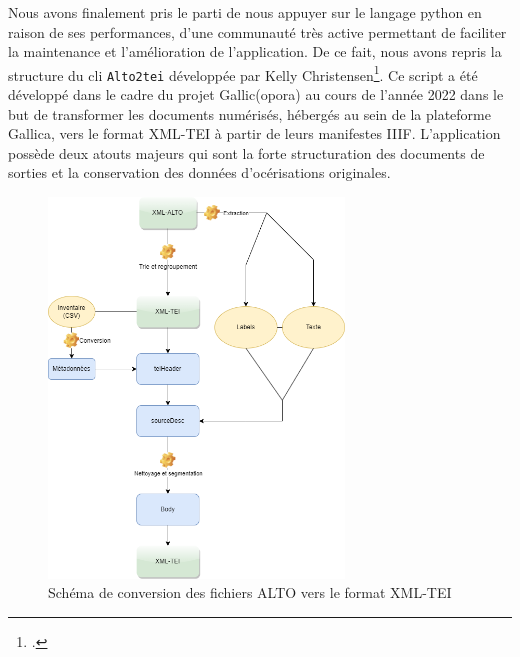 	Nous avons finalement pris le parti de nous appuyer sur le langage python en raison de ses performances, d'une communauté très active permettant de faciliter la maintenance et l'amélioration de l'application. De ce fait, nous avons repris la structure du \gls{cli} \texttt{Alto2tei} développée par Kelly Christensen\footcite{christensenAlto2tei2022}. Ce script a été développé dans le cadre du projet Gallic(opora) au cours de l'année 2022 dans le but de transformer les documents numérisés, hébergés au sein de la plateforme Gallica, vers le format XML-TEI à partir de leurs manifestes IIIF. L'application possède deux atouts majeurs qui sont la forte structuration des documents de sorties et la conservation des données d'océrisations originales.
	
	
	\begin{figure}[!h]
	    \centering
	    \includegraphics[width=0.7\textwidth]{annexes/schema/altototei.png}
	    \caption{Schéma de conversion des fichiers ALTO vers le format XML-TEI}
	    \label{fig:altototei}
	\end{figure}
	

